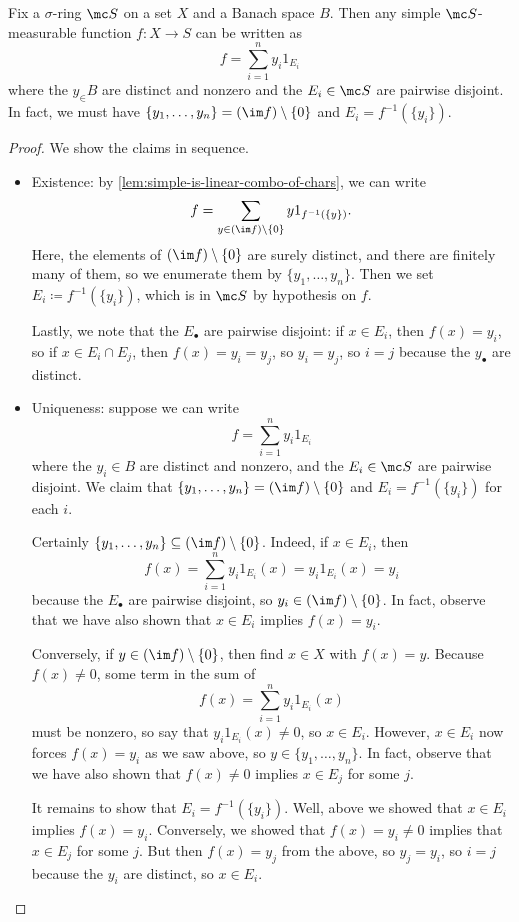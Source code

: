 \documentclass[../notes.tex]{subfiles}
\begin{document}
\begin{lemma}
	Fix a $\sigma$-ring $\mc S$ on a set $X$ and a Banach space $B$. Then any simple $\mc S$-measurable function $f\colon X\to S$ can be written as
	\[f=\sum_{i=1}^ny_i1_{E_i}\]
	where the $y_\in B$ are distinct and nonzero and the $E_i\in\mc S$ are pairwise disjoint. In fact, we must have $\{y_1,\ldots,y_n\}=(\im f)\setminus\{0\}$ and $E_i=f^{-1}(\{y_i\})$.
\end{lemma}
\begin{proof}
	We show the claims in sequence.
	\begin{itemize}
		\item Existence: by \autoref{lem:simple-is-linear-combo-of-chars}, we can write
		\[f=\sum_{y\in(\im f)\setminus\{0\}}y1_{f^{-1}(\{y\})}.\]
		Here, the elements of $(\im f)\setminus\{0\}$ are surely distinct, and there are finitely many of them, so we enumerate them by $\{y_1,\ldots,y_n\}$. Then we set $E_i\coloneqq f^{-1}(\{y_i\})$, which is in $\mc S$ by hypothesis on $f$.

		Lastly, we note that the $E_\bullet$ are pairwise disjoint: if $x\in E_i$, then $f(x)=y_i$, so if $x\in E_i\cap E_j$, then $f(x)=y_i=y_j$, so $y_i=y_j$, so $i=j$ because the $y_\bullet$ are distinct.

		\item Uniqueness: suppose we can write
		\[f=\sum_{i=1}^ny_i1_{E_i}\]
		where the $y_i\in B$ are distinct and nonzero, and the $E_i\in\mc S$ are pairwise disjoint. We claim that $\{y_1,\ldots,y_n\}=(\im f)\setminus\{0\}$ and $E_i=f^{-1}(\{y_i\})$ for each $i$.

		Certainly $\{y_1,\ldots,y_n\}\subseteq(\im f)\setminus\{0\}$. Indeed, if $x\in E_i$, then
		\[f(x)=\sum_{i=1}^ny_i1_{E_i}(x)=y_i1_{E_i}(x)=y_i\]
		because the $E_\bullet$ are pairwise disjoint, so $y_i\in(\im f)\setminus\{0\}$. In fact, observe that we have also shown that $x\in E_i$ implies $f(x)=y_i$.
		
		Conversely, if $y\in(\im f)\setminus\{0\}$, then find $x\in X$ with $f(x)=y$. Because $f(x)\ne0$, some term in the sum of
		\[f(x)=\sum_{i=1}^ny_i1_{E_i}(x)\]
		must be nonzero, so say that $y_i1_{E_i}(x)\ne0$, so $x\in E_i$. However, $x\in E_i$ now forces $f(x)=y_i$ as we saw above, so $y\in\{y_1,\ldots,y_n\}$. In fact, observe that we have also shown that $f(x)\ne0$ implies $x\in E_j$ for some $j$.

		It remains to show that $E_i=f^{-1}(\{y_i\})$. Well, above we showed that $x\in E_i$ implies $f(x)=y_i$. Conversely, we showed that $f(x)=y_i\ne0$ implies that $x\in E_j$ for some $j$. But then $f(x)=y_j$ from the above, so $y_j=y_i$, so $i=j$ because the $y_i$ are distinct, so $x\in E_i$.
		\qedhere
	\end{itemize}
\end{proof}
\end{document}

